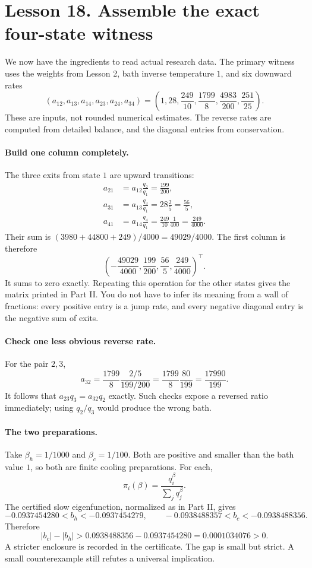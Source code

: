 \clearpage
\section*{Lesson 18. Assemble the exact four-state witness}
We now have the ingredients to read actual research data. The primary
witness uses the weights from Lesson 2, bath inverse temperature $1$, and
six downward rates
\[
(a_{12},a_{13},a_{14},a_{23},a_{24},a_{34})
=\left(1,28,\frac{249}{10},\frac{1799}{8},
\frac{4983}{200},\frac{251}{25}\right).
\]
These are inputs, not rounded numerical estimates. The reverse rates are
computed from detailed balance, and the diagonal entries from conservation.

\paragraph{Build one column completely.}
The three exits from state $1$ are upward transitions:
\begin{align*}
a_{21}&=a_{12}\frac{q_2}{q_1}=\frac{199}{200},\\
a_{31}&=a_{13}\frac{q_3}{q_1}=28\frac25=\frac{56}{5},\\
a_{41}&=a_{14}\frac{q_4}{q_1}=\frac{249}{10}\frac1{400}
=\frac{249}{4000}.
\end{align*}
Their sum is $(3980+44800+249)/4000=49029/4000$.
The first column is therefore
\[
\left(-\frac{49029}{4000},\frac{199}{200},
\frac{56}{5},\frac{249}{4000}\right)^\top.
\]
It sums to zero exactly. Repeating this operation for the other states gives
the matrix printed in Part II. You do not have to infer its meaning from a
wall of fractions: every positive entry is a jump rate, and every negative
diagonal entry is the negative sum of exits.

\paragraph{Check one less obvious reverse rate.}
For the pair $2,3$,
\[
a_{32}=\frac{1799}{8}\frac{2/5}{199/200}
=\frac{1799}{8}\frac{80}{199}=\frac{17990}{199}.
\]
It follows that $a_{23}q_3=a_{32}q_2$ exactly. Such checks expose a reversed
ratio immediately; using $q_2/q_3$ would produce the wrong bath.

\paragraph{The two preparations.}
Take $\beta_h=1/1000$ and $\beta_c=1/100$. Both are positive and smaller
than the bath value $1$, so both are finite cooling preparations. For each,
\[
\pi_i(\beta)=\frac{q_i^\beta}{\sum_jq_j^\beta}.
\]
The certified slow eigenfunction, normalized as in Part II, gives
\[
-0.0937454280<b_h<-0.0937454279,
\qquad
-0.0938488357<b_c<-0.0938488356.
\]
Therefore
\[
|b_c|-|b_h|>0.0938488356-0.0937454280=0.0001034076>0.
\]
A stricter enclosure is recorded in the certificate. The gap is small but
strict. A small counterexample still refutes a universal implication.

